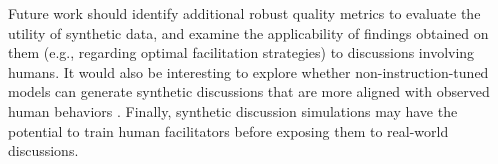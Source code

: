 %

Future work should identify additional robust quality metrics to evaluate the utility of synthetic data, and examine the applicability of findings obtained on  them (e.g., regarding optimal facilitation strategies) to discussions involving humans. It would also be interesting to explore whether non-instruction-tuned models can generate synthetic discussions that are more aligned with observed human behaviors \cite{anthis_2025}. Finally, synthetic discussion simulations may have the potential to train human facilitators before exposing them to real-world discussions.